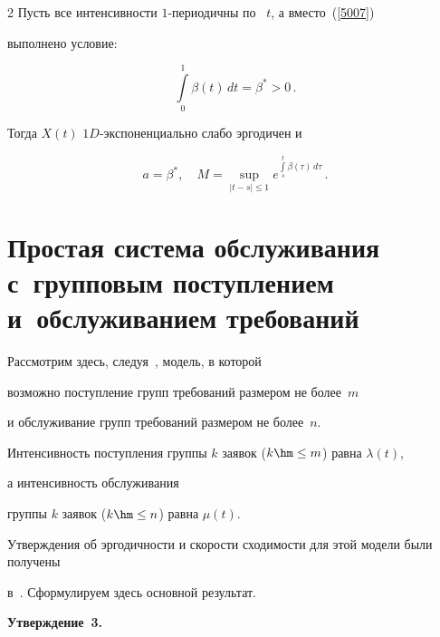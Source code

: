 \begin{multicols}{2}
Пусть все интенсивности $1$-пе\-ри\-о\-дич\-ны по~ $t$, а вместо~(\ref{5007})

выполнено условие:

\begin{equation*}

\int\limits_0^{1}\beta\left( t\right)\, dt = \beta^* > 0\,.


\end{equation*}

Тогда  $X(t)$  $1D$-экс\-по\-нен\-ци\-аль\-но слабо эргодичен и

\begin{equation*}

a= \beta^*, \quad M = \sup\limits_{|t-s|\le 1}

e^{\int\limits_s^{t}\beta\left( \tau\right)\, d\tau}\,.


\end{equation*}





\section{Простая система обслуживания с~групповым поступлением и~обслуживанием требований}



Рассмотрим здесь, следуя~\cite{z12b}, модель, в которой

возможно поступление групп требований размером не более~$m$

и обслуживание групп требований размером не более~$n$.

Интенсивность поступления группы  $k$ заявок  ($k \hm\le m$) равна $\lambda(t)$,

а интенсивность обслуживания

группы  $k$ заявок ($k \hm\le n$) равна $\mu(t)$.



\smallskip

Утверждения об эргодичности и скорости сходимости для этой модели были получены

в~\cite{z12b}. Сформулируем здесь основной результат.



\medskip



\noindent

\textbf{Утверждение~3.}\


\end{multicols}
